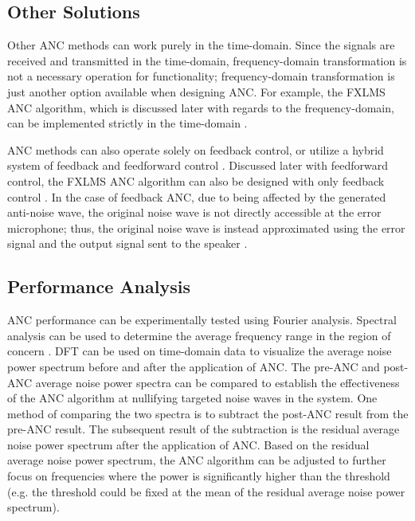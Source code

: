 \documentclass[11pt, letterpaper]{article}
\numberwithin{equation}{section}
\begin{document}
\subsection{Other Solutions}

Other ANC methods can work purely in the time-domain. Since the signals are received and transmitted in the time-domain, frequency-domain transformation is not a necessary operation for functionality; frequency-domain transformation is just another option available when designing ANC. For example, the FXLMS ANC algorithm, which is discussed later with regards to the frequency-domain, can be implemented strictly in the time-domain \cite{kajikawa}.

ANC methods can also operate solely on feedback control, or utilize a hybrid system of feedback and feedforward control \cite{gaur}. Discussed later with feedforward control, the FXLMS ANC algorithm can also be designed with only feedback control \cite{roy}. In the case of feedback ANC, due to being affected by the generated anti-noise wave, the original noise wave is not directly accessible at the error microphone; thus, the original noise wave is instead approximated using the error signal and the output signal sent to the speaker \cite{roy}.

\subsection{Performance Analysis}

ANC performance can be experimentally tested using Fourier analysis. Spectral analysis can be used to determine the average frequency range in the region of concern \cite{chen}. DFT can be used on time-domain data to visualize the average noise power spectrum before and after the application of ANC. The pre-ANC and post-ANC average noise power spectra can be compared to establish the effectiveness of the ANC algorithm at nullifying targeted noise waves in the system. One method of comparing the two spectra is to subtract the post-ANC result from the pre-ANC result. The subsequent result of the subtraction is the residual average noise power spectrum after the application of ANC. Based on the residual average noise power spectrum, the ANC algorithm can be adjusted to further focus on frequencies where the power is significantly higher than the threshold (e.g. the threshold could be fixed at the mean of the residual average noise power spectrum).

\pagebreak
\end{document}
